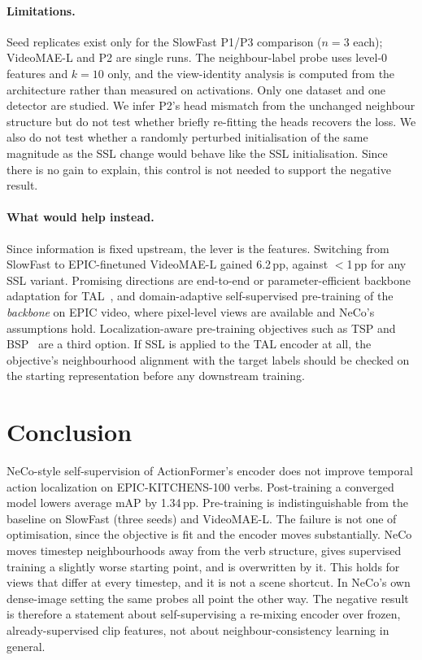 \documentclass[10pt,a4paper]{article}
\newcommand{\pp}{\,pp}
\begin{document}
\paragraph{Limitations.} Seed replicates exist only for the SlowFast P1/P3 comparison
($n{=}3$ each); VideoMAE-L and P2 are single runs. The neighbour-label probe uses level-0
features and $k{=}10$ only, and the view-identity analysis is computed from the
architecture rather than measured on activations. Only one dataset and one detector are
studied. We infer P2's head mismatch from the unchanged neighbour structure but do not
test whether briefly re-fitting the heads recovers the loss. We also do not test whether a
randomly perturbed initialisation of the same magnitude
as the SSL change would behave like the SSL initialisation. Since there is no gain to
explain, this control is not needed to support the negative result.

\paragraph{What would help instead.} Since information is fixed upstream, the lever is the
features. Switching from SlowFast to EPIC-finetuned VideoMAE-L gained 6.2\pp, against
$<$1\pp{} for any SSL variant. Promising directions are end-to-end or parameter-efficient
backbone adaptation for TAL~\cite{liu2024adatad}, and domain-adaptive self-supervised
pre-training of the \emph{backbone} on EPIC video, where pixel-level views are available and
NeCo's assumptions hold. Localization-aware pre-training objectives such as TSP and
BSP~\cite{alwassel2021tsp,xu2021bsp} are a third option. If SSL is applied to the TAL
encoder at all, the objective's neighbourhood alignment with the target labels should be
checked on the starting representation before any downstream training.

\section{Conclusion}

NeCo-style self-supervision of ActionFormer's encoder does not improve temporal action
localization on EPIC-KITCHENS-100 verbs. Post-training a converged model lowers average mAP
by 1.34\pp. Pre-training is indistinguishable from the baseline on SlowFast (three seeds)
and VideoMAE-L. The failure is not one of optimisation, since the objective is fit and the
encoder moves substantially. NeCo moves timestep neighbourhoods away from the verb structure,
gives supervised training a slightly worse starting point, and is overwritten by it. This
holds for views that differ at every timestep, and it is not a scene shortcut. In NeCo's own
dense-image setting the same probes all point the other way. The negative result
is therefore a statement about self-supervising a re-mixing encoder over frozen,
already-supervised clip features, not about neighbour-consistency learning in general.

\small


\end{document}
